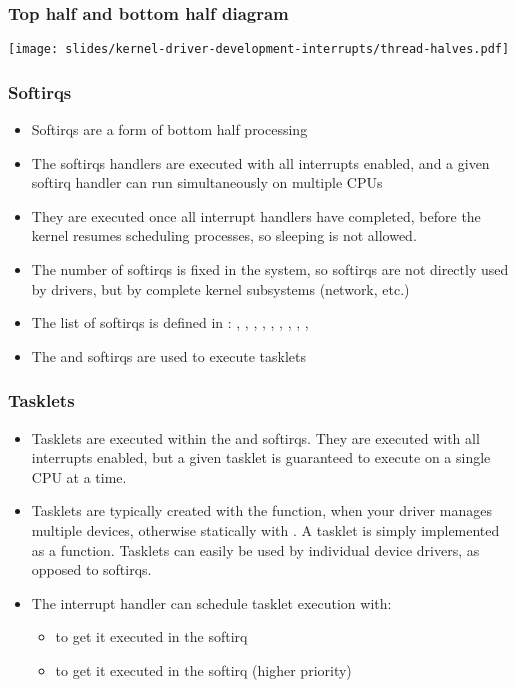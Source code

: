 \begin{frame}
  \frametitle{Top half and bottom half diagram}
  \begin{center}
    \texttt{[image: slides/kernel-driver-development-interrupts/thread-halves.pdf]}
  \end{center}
\end{frame}

\begin{frame}
  \frametitle{Softirqs}
  \begin{itemize}
  \item Softirqs are a form of bottom half processing
  \item The softirqs handlers are executed with all interrupts
    enabled, and a given softirq handler can run simultaneously on
    multiple CPUs
  \item They are executed once all interrupt handlers have completed,
    before the kernel resumes scheduling processes, so sleeping is not
    allowed.
  \item The number of softirqs is fixed in the system, so softirqs are
    not directly used by drivers, but by complete kernel subsystems
    (network, etc.)
  \item The list of softirqs is defined in
    : , ,
    , , , ,
    , , , 
  \item The  and  softirqs are used to execute
    tasklets
  \end{itemize}
\end{frame}

\begin{frame}
  \frametitle{Tasklets}
  \begin{itemize}
  \item Tasklets are executed within the  and 
    softirqs. They are executed with all interrupts enabled, but a
    given tasklet is guaranteed to execute on a single CPU at a time.
  \item Tasklets are typically created with the 
    function, when your driver manages multiple devices, otherwise
    statically with . A tasklet is simply
    implemented as a function. Tasklets can easily
    be used by individual device drivers, as opposed to softirqs.
  \item The interrupt handler can schedule tasklet execution with:
    \begin{itemize}
    \item {} to get it executed in the
       softirq
    \item {} to get it executed in the
       softirq (higher priority)
    \end{itemize}
  \end{itemize}
\end{frame}

